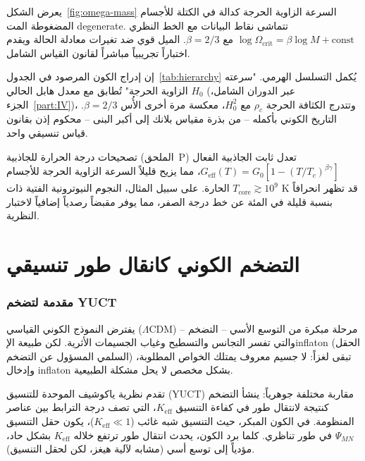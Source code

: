 \documentclass[12pt,a4paper]{article}
\newcommand{\Keff}{K_{\mathrm{eff}}}
\begin{document}
	\noindent يعرض الشكل~\ref{fig:omega-mass} السرعة الزاوية الحرجة كدالة في الكتلة للأجسام المضغوطة المت degenerate. تتماشى نقاط البيانات مع الخط النظري \(\log\Omega_{\mathrm{crit}} = \beta \log M + \mathrm{const}\) مع \(\beta = 2/3\). الميل قوي ضد تغيرات معادلة الحالة ويقدم اختباراً تجريبياً مباشراً لقانون القياس الشامل.
	
	إن إدراج الكون المرصود في الجدول~\ref{tab:hierarchy} يُكمل التسلسل الهرمي. "سرعته الزاوية الحرجة" تُطابق مع معدل هابل الحالي \(H_0\) (عبر الدوران الشامل، الجزء~\ref{part:IV})، وتتدرج الكثافة الحرجة \(\rho_c\) مع \(H_0^2\)، معكسة مرة أخرى الأُس \(\beta=2/3\). التاريخ الكوني بأكمله – من بذرة مقياس بلانك إلى أكبر البنى – محكوم إذن بقانون قياس تنسيقي واحد.
	
	تصحيحات درجة الحرارة للجاذبية (الملحق~P) تعدل ثابت الجاذبية الفعال \(G_{\mathrm{eff}}(T) = G_0[1 - (T/T_c)^{\beta\gamma}]\)، مما يزيح قليلاً السرعة الزاوية الحرجة للأجسام الحارة. على سبيل المثال، النجوم النيوترونية الفتية ذات \(T_{\mathrm{core}} \gtrsim 10^9\) K قد تظهر انحرافاً بنسبة قليلة في المئة عن خط درجة الصفر، مما يوفر مقبضاً رصدياً إضافياً لاختبار النظرية.
	
	\part{التضخم الكوني كانقال طور تنسيقي}
	\label{part:III}
	
	\section{مقدمة لتضخم YUCT}
	\label{sec:intro-inflation}
	
	يفترض النموذج الكوني القياسي (\(\Lambda\)CDM) مرحلة مبكرة من التوسع الأسي – التضخم – والتي تفسر التجانس والتسطيح وغياب الجسيمات الأثرية. لكن طبيعة الإinflaton (الحقل السلمي المسؤول عن التضخم) تبقى لغزاً: لا جسيم معروف يمتلك الخواص المطلوبة، وإدخال inflaton بشكل مخصص لا يحل مشكلة الطبيعية.
	
	تقدم نظرية ياكوشيف الموحدة للتنسيق (YUCT) مقاربة مختلفة جوهرياً: ينشأ التضخم كنتيجة لانتقال طور في كفاءة التنسيق \(\Keff\)، التي تصف درجة الترابط بين عناصر المنظومة. في الكون المبكر، حيث التنسيق شبه غائب (\(\Keff \ll 1\))، يكون حقل التنسيق \(\Psi_{MN}\) في طور تناظري. كلما برد الكون، يحدث انتقال طور ترتفع خلاله \(\Keff\) بشكل حاد، مؤدياً إلى توسع أسي (مشابه لآلية هيغز، لكن لحقل التنسيق).
	
\end{document}
